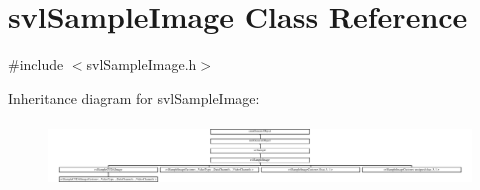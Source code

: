 \hypertarget{classsvl_sample_image}{\section{svl\-Sample\-Image Class Reference}
\label{classsvl_sample_image}
}


{\ttfamily \#include $<$svl\-Sample\-Image.\-h$>$}

Inheritance diagram for svl\-Sample\-Image\-:\begin{figure}[H]
\begin{center}
\leavevmode
\includegraphics[height=1.768421cm]{dd/d81/classsvl_sample_image}
\end{center}
\end{figure}
